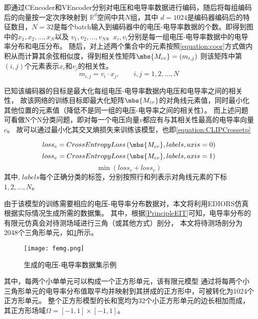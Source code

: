 即通过CEncoder和VEncoder分别对电压和电导率数据进行编码，随后将每组编码后的向量按一定次序映射到 $\mathbb{R}^d$空间中共$N$组，其中
$d=1024$是编码器编码后的特征数目，$N=32$是每个batch输入到编码器中的电压-电导率数据的个数。即得到图中的$x_1, x_2,...,x_N$以及
$v_1, v_2,..., v_N$。$x_i,v_i$分别是每一组电压-电导率数据中的电导率分布和电压分布。
随后，对上述两个集合中的元素按照\cref{equation:coor}方式做内积从而计算其余弦相似度，得到相关性矩阵$\mbs{M_{cv}}= \left(m_{i,j}\right)$
则该矩阵中第$(i,j)$个元素表示$x_i$和$v_j$的相关性。
\begin{equation}
    \label{equation:coor}
    m_{i,j} = v_{i} \cdot x_{j}, \qquad i,j=1,2,...,N
\end{equation}


已知该编码器的目标是最大化每组电压-电导率数据内电压和电导率之间的相关性，
故该网络的训练目标即最大化矩阵$\mbs{M_{cv}}$的对角线元素值，同时最小化其他位置的元素值（降低不是同一组的电压-电导率之间的相关性）。
而上述问题可看做N个N分类问题，即对每一个电压向量$v$都应有与其相关性最高的电导率向量$c$。
故可以通过最小化其交叉熵损失来训练该模型，也即\cref{equation:CLIPCrossetp}

\begin{equation}
    loss_c = CrossEntropyLoss \left(\mbs{M_{cv}}, labels, axis=0\right)
\end{equation}
\begin{equation}
    loss_v = CrossEntropyLoss \left(\mbs{M_{cv}}, labels, axis=1\right)
\end{equation}
\begin{equation}
    \label{equation:CLIPCrossetp}
    \min \left(loss_c + loss_v\right)
\end{equation}
其中, $labels$每个正确分类的标签，分别按照行和列表示对角线元素的下标$1,2,...,N$。

由于该模型的训练需要相应的电压-电导率分布数据对，本文将利用EDIORS仿真根据实际情况生成所需的数据集。
其中，根据\cref{PrincipleEIT}可知，电导率分布的有限元仿真会对待测场域进行三角（或其他方式）剖分，
本文将待测场剖分为2048个三角形单元，如\cref{figure:femg}所示。

\begin{figure}[h]
    \centering
    \texttt{[image: femg.png]}
    \caption{生成的电压-电导率数据集示例}
    \label{figure:femg}
\end{figure}

其中，每两个小单单元可以构成一个正方形单元，该有限元模型
通过将每两个小三角形单元的电导率分布值取平均并映射到其拼成的正方形中，可被转化为1024个正方形单元。
整个正方形模型的长和宽均为32个小正方形单元的边长相加而成，其正方形场域$\Omega = \left[-1, 1\right] \times \left[-1, 1\right]$。


